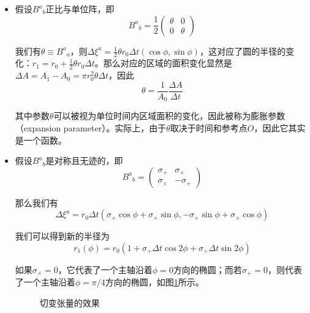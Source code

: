 \documentclass[hyperref, UTF8, a4paper]{ctexart}
\begin{document}
\begin{itemize}
\item 假设$B^{a}{}_{b}$正比与单位阵，即
\begin{equation*}
	B^{a}{}_{b} =\frac{1}{2}\begin{pmatrix}
		\theta  & 0\\
		0 & \theta 
	\end{pmatrix}
\end{equation*}

我们有$\theta \equiv B^{a}{}_{a}$，则$\Delta \xi ^{a} =\frac{1}{2} \theta r_{0} \Delta t(\cos \phi ,\sin \phi )$，这对应了圆的半径的变化：$r_{1} =r_{0} +\frac{1}{2} \theta r_{0} \Delta t$。那么对应的区域的面积变化显然是$\Delta A=A_{1} -A_{0} =\pi r_{0}^{2} \theta \Delta t$，因此
\begin{equation*}
	\theta =\frac{1}{A_{0}}\frac{\Delta A}{\Delta t}
\end{equation*}

其中参数$\theta $可以被视为单位时间内区域面积的变化，因此被称为膨胀参数（expansion parameter）。实际上，由于$\theta $取决于时间和参考点$O$，因此它其实是一个函数。
\item 假设$B^{a}{}_{b}$是对称且无迹的，即
\begin{equation*}
	B^{a}{}_{b} =\begin{pmatrix}
		\sigma _{+} & \sigma _{\times }\\
		\sigma _{\times } & -\sigma _{+}
	\end{pmatrix}
\end{equation*}

那么我们有
\begin{equation*}
	\Delta \xi ^{a} =r_{0} \Delta t( \sigma _{+}\cos \phi +\sigma _{\times }\sin \phi ,-\sigma _{+}\sin \phi +\sigma _{\times }\cos \phi )
\end{equation*}

我们可以得到新的半径为
\begin{equation*}
	r_{1}( \phi ) =r_{0}( 1+\sigma _{+} \Delta t\cos 2\phi +\sigma _{\times } \Delta t\sin 2\phi )
\end{equation*}

如果$\sigma _{\times } =0$，它代表了一个主轴沿着$\phi =0$方向的椭圆；而若$\sigma _{+} =0$，则代表了一个主轴沿着$\phi =\pi /4$方向的椭圆，如图\ref{fig:shear_effect}所示。

\begin{figure}
	\centering
	
	\caption{切变张量的效果}
	\label{fig:shear_effect}
\end{figure}


\end{itemize}
\end{document}
